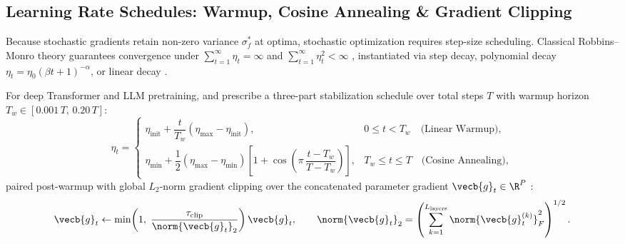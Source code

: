 \documentclass[../../../../master.tex]{subfiles}
\begin{document}
\subsection{Learning Rate Schedules: Warmup, Cosine Annealing \& Gradient Clipping}
\label{subsec:optalg:schedules}

Because stochastic gradients retain non-zero variance $\sigma_f^*$ at optima, stochastic optimization requires step-size scheduling. Classical Robbins--Monro theory guarantees convergence under $\sum_{t=1}^\infty \eta_t = \infty$ and $\sum_{t=1}^\infty \eta_t^2 < \infty$  , instantiated via step decay, polynomial decay $\eta_t = \eta_0(\beta t + 1)^{-\alpha}$, or linear decay .

For deep Transformer and LLM pretraining,  and  prescribe a three-part stabilization schedule over total steps $T$ with warmup horizon $T_w \in [0.001\,T,\, 0.20\,T]$:
\begin{equation}
\label{eq:optalg:warmup_cosine}
  \eta_t =
  \begin{cases}
    \eta_{\mathrm{init}} + \dfrac{t}{T_w}(\eta_{\max} - \eta_{\mathrm{init}}), & 0 \le t < T_w \quad\text{(Linear Warmup)}, \\[8pt]
    \eta_{\min} + \dfrac{1}{2}(\eta_{\max} - \eta_{\min})\!\left[1 + \cos\!\left(\pi\,\dfrac{t - T_w}{T - T_w}\right)\right], & T_w \le t \le T \quad\text{(Cosine Annealing)},
  \end{cases}
\end{equation}
paired post-warmup with global $L_2$-norm gradient clipping over the concatenated parameter gradient $\vecb{g}_t \in \R^P$  :
\begin{equation}
\label{eq:optalg:grad_clip}
  \vecb{g}_t \leftarrow \min\!\left(1,\; \frac{\tau_{\mathrm{clip}}}{\norm{\vecb{g}_t}_2}\right)\vecb{g}_t, \qquad \norm{\vecb{g}_t}_2 = \left(\sum_{k=1}^{L_{\mathrm{layers}}} \norm{\vecb{g}_t^{(k)}}_F^2\right)^{1/2}.
\end{equation}
\end{document}
